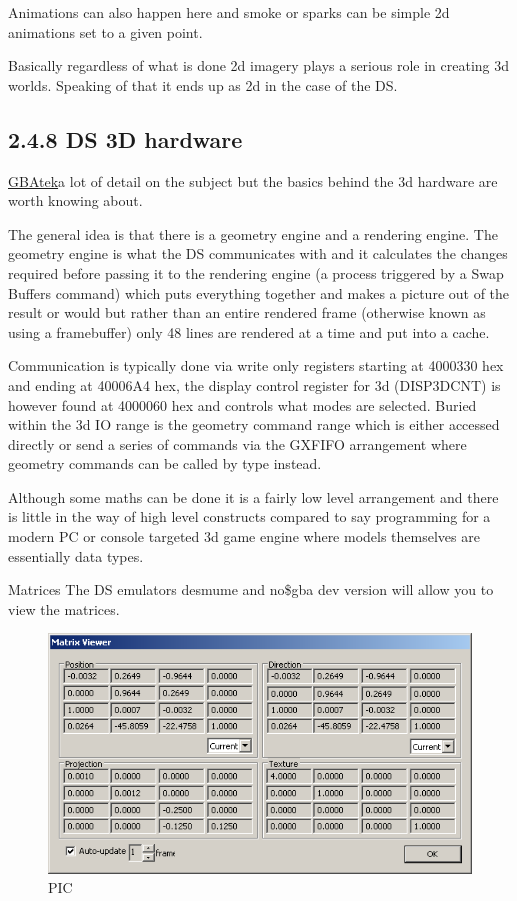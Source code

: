 \documentclass[
]{book}
\begin{document}
Animations can also happen here and smoke or sparks can be simple 2d animations set to a given point.

Basically regardless of what is done 2d imagery plays a serious role in creating 3d worlds. Speaking of that it ends up as 2d in the case of the DS.

\hypertarget{ds-3d-hardware}{%
\subsection{2.4.8 DS 3D hardware}\label{ds-3d-hardware}}

\href{http://problemkaputt.de/gbatek.htm\#ds3dvideocontains}{GBAtek}a lot of detail on the subject but the basics behind the 3d hardware are worth knowing about.

The general idea is that there is a geometry engine and a rendering engine. The geometry engine is what the DS communicates with and it calculates the changes required before passing it to the rendering engine (a process triggered by a Swap Buffers command) which puts everything together and makes a picture out of the result or would but rather than an entire rendered frame (otherwise known as using a framebuffer) only 48 lines are rendered at a time and put into a cache.

Communication is typically done via write only registers starting at 4000330 hex and ending at 40006A4 hex, the display control register for 3d (DISP3DCNT) is however found at 4000060 hex and controls what modes are selected. Buried within the 3d IO range is the geometry command range which is either accessed directly or send a series of commands via the GXFIFO arrangement where geometry commands can be called by type instead.

Although some maths can be done it is a fairly low level arrangement and there is little in the way of high level constructs compared to say programming for a modern PC or console targeted 3d game engine where models themselves are essentially data types.

Matrices The DS emulators desmume and no\$gba dev version will allow you to view the matrices.

\begin{figure}
\centering
\includegraphics{images/61_home_fast6191_romhackingguide_unrenamed_file___l_borders_romhackingguidegraphics3dmatrix_1.png}
\caption{PIC}
\end{figure}
\end{document}
